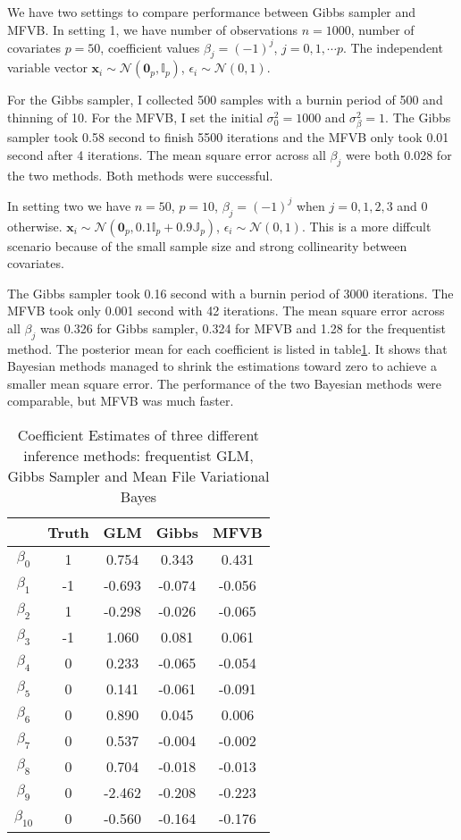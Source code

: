 \documentclass[12pt]{article}
\begin{document}
We have two settings to compare performance between Gibbs sampler and MFVB. In setting 1, we have number of observations $n=1000$, number of covariates $p=50$, coefficient values $\beta_{j}=(-1)^j$, $j = 0,1,\cdots p$. The independent variable vector $\bm{x}_i \sim \mathcal{N}(\bm{0}_{p}, \mathbb{I}_{p})$, $\epsilon_{i}\sim \mathcal{N}(0, 1)$.

For the Gibbs sampler, I collected 500 samples with a burnin period of 500 and thinning of 10. For the MFVB, I set the initial $\sigma_{0}^2=1000$ and $\sigma_{\beta}^2=1$. The Gibbs sampler took 0.58 second to finish 5500 iterations and the MFVB only took 0.01 second after 4 iterations. The mean square error across all $\beta_{j}$ were both 0.028 for the two methods. Both methods were successful.


In setting two we have $n=50$, $p=10$, $\beta_j = (-1)^j$ when $j=0,1,2,3$ and 0 otherwise. $\bm{x}_i \sim \mathcal{N}(\bm{0}_{p}, 0.1\mathbb{I}_{p} + 0.9\mathbb{J}_{p})$, $\epsilon_{i}\sim \mathcal{N}(0, 1)$. This is a more diffcult scenario because of the small sample size and strong collinearity between covariates.

The Gibbs sampler took 0.16 second with a burnin period of 3000 iterations. The MFVB took only 0.001 second with 42 iterations. The mean square error across all $\beta_{j}$ was 0.326 for Gibbs sampler, 0.324 for MFVB and 1.28 for the frequentist method. The posterior mean for each coefficient is listed in table\ref{result}. It shows that Bayesian methods managed to shrink the estimations toward zero to achieve a smaller mean square error. The performance of the two Bayesian methods were comparable, but MFVB was much faster.

\begin{table}[htbp]
	\centering
	\begin{tabular}{ccccc}
	\toprule
	&Truth & GLM & Gibbs & MFVB\\
	\midrule
	$\beta_0$ &1 & 0.754 & 0.343 & 0.431 \\
	$\beta_1$ &-1 & -0.693 & -0.074 & -0.056 \\
	$\beta_2$ &1 & -0.298 & -0.026 & -0.065 \\
	$\beta_3$ &-1 & 1.060 & 0.081 & 0.061 \\
	$\beta_4$ &0 & 0.233 & -0.065 & -0.054 \\
	$\beta_5$ &0 & 0.141 & -0.061 & -0.091 \\
	$\beta_6$ &0 & 0.890 & 0.045 & 0.006 \\
	$\beta_7$ &0 & 0.537 & -0.004 & -0.002 \\
	$\beta_8$ &0 & 0.704 & -0.018 & -0.013 \\
	$\beta_9$ &0 & -2.462 & -0.208 & -0.223 \\
	$\beta_{10}$ &0 & -0.560 & -0.164 & -0.176 \\
	\bottomrule 
	\end{tabular}
	\caption{Coefficient Estimates of three different inference methods: frequentist GLM, Gibbs Sampler and Mean File Variational Bayes}\label{result}
\end{table}


\end{document}
